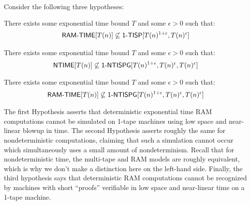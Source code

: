 Consider the following three hypotheses:
\begin{hypothesis}\label{lossy:hyp:tisp-lb}
There exists some exponential time bound $T$ and some $\epsilon > 0$ such that:
\[
\cl{RAM\dash TIME}[T(n)] \not\subseteq \cl{1\dash TISP}[T(n)^{1+\epsilon}, T(n)^{\epsilon}]
\]
\end{hypothesis}
\begin{hypothesis}\label{lossy:hyp:ntisp-lb}
There exists some exponential time bound $T$ and some $\epsilon > 0$ such that:
\[
\cl{NTIME}[T(n)] \not\subseteq \cl{1\dash NTISPG}[T(n)^{1+\epsilon}, T(n)^{\epsilon}, T(n)^{\epsilon}]
\]
\end{hypothesis}

\begin{hypothesis}\label{lossy:hyp:strong-ntisp-lb}
There exists some exponential time bound $T$ and some $\epsilon > 0$ such that:
\[
\cl{RAM\dash TIME}[T(n)] \not\subseteq \cl{1\dash NTISPG}[T(n)^{1+\epsilon}, T(n)^{\epsilon}, T(n)^{\epsilon}]
\]
\end{hypothesis}

The first Hypothesis asserts that deterministic exponential time RAM computations cannot be simulated on 1-tape machines using low space and near-linear blowup in time. The second Hypothesis asserts roughly the same for nondeterministic computations, claiming that such a simulation cannot occur which simultaneously uses a small amount of nondeterminism. Recall that for nondeterministic time, the multi-tape and RAM models are roughly equivalent, which is why we don't make a distinction here on the left-hand side. Finally, the third hypothesis says that deterministic RAM computations cannot be recognized by machines with short ``proofs'' verifiable in low space and near-linear time on a 1-tape machine.

